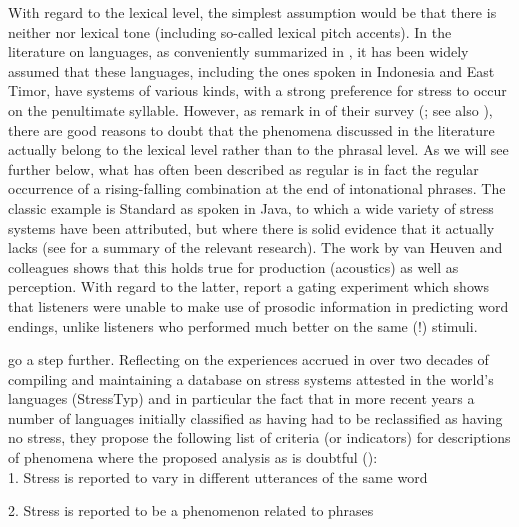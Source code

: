 \documentclass[output=paper
,modfonts
,nonflat]{langsci/langscibook}
\begin{document}
With regard to the lexical level, the simplest assumption would be that there is neither  nor lexical tone (including so-called lexical pitch accents). In the literature on  languages, as conveniently summarized in \citet{van2010}, it has been widely assumed that these languages, including the ones spoken in Indonesia and East Timor, have  systems of various kinds, with a strong preference for stress to occur on the penultimate syllable. However, as \citeauthor{van2010} remark in  of their survey (\citealt[99--102]{van2010}; see also \citealt[194]{van2007a}), there are good reasons to doubt that the  phenomena discussed in the literature actually belong to the lexical level rather than to the phrasal level. As we will see further below, what has often been described as regular  is in fact the regular occurrence of a rising-falling  combination at the end of intonational phrases. The classic example is Standard  as spoken in Java, to which a wide variety of stress systems have been attributed, but where there is solid evidence that it actually lacks  (see \citealt{Goedemans2007} for a summary of the relevant research). The work by van Heuven and colleagues shows that this holds true for production (acoustics) as well as perception. With regard to the latter, \citet{van1998} report a gating experiment which shows that  listeners were unable to make use of prosodic information in predicting word endings, unlike  listeners who performed much better on the same (!) stimuli.

\citet{Goedemans2014} go a step further. Reflecting on the experiences accrued in over two decades of compiling and maintaining a database on stress systems attested in the world’s languages (StressTyp) and in particular the fact that in more recent years a number of languages initially classified as having  had to be reclassified as having no stress, they propose the following list of criteria (or indicators) for descriptions of  phenomena where the proposed analysis as  is doubtful (\citealt[88]{Goedemans2014}): \\

1. Stress is reported to vary in different utterances of the same word

2. Stress is reported to be a phenomenon related to phrases
\end{document}
